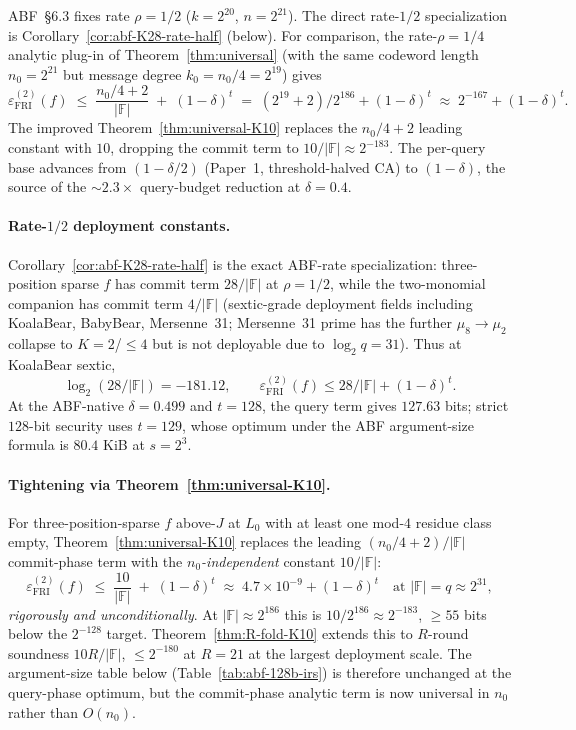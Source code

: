 \documentclass[11pt]{article}
\theoremstyle{definition}
\theoremstyle{remark}
\newcommand{\FF}{\mathbb{F}}
\begin{document}
ABF~\S 6.3 fixes rate $\rho = 1/2$ ($k = 2^{20}$, $n = 2^{21}$). The
direct rate-$1/2$ specialization is Corollary~\ref{cor:abf-K28-rate-half}
(below). For comparison, the rate-$\rho = 1/4$ analytic plug-in of
Theorem~\ref{thm:universal} (with the same codeword length $n_0 = 2^{21}$
but message degree $k_0 = n_0/4 = 2^{19}$) gives
\[
\varepsilon^{(2)}_{\mathrm{FRI}}(f)
\;\leq\;
\frac{n_0/4 + 2}{|\mathbb{F}|}
\;+\;
(1-\delta)^{t}
\;=\;
(2^{19} + 2)/2^{186} + (1-\delta)^{t} \;\approx\; 2^{-167} + (1-\delta)^{t}.
\]
The improved Theorem~\ref{thm:universal-K10} replaces the
$n_0/4 + 2$ leading constant with $10$, dropping the commit term to
$10/|\mathbb{F}| \approx 2^{-183}$. The per-query base advances from
$(1{-}\delta/2)$ (Paper~1, threshold-halved CA) to $(1{-}\delta)$,
the source of the ${\sim}2.3{\times}$ query-budget reduction at
$\delta = 0.4$.

\paragraph{Rate-$1/2$ deployment constants.}
Corollary~\ref{cor:abf-K28-rate-half} is the exact ABF-rate specialization:
three-position sparse $f$ has commit term $28/|\FF|$ at $\rho=1/2$,
while the two-monomial companion has commit term $4/|\FF|$ (sextic-grade
deployment fields including KoalaBear, BabyBear, Mersenne~31; Mersenne~31
prime has the further $\mu_8 \to \mu_2$ collapse to $K = 2$/$\leq 4$ but
is not deployable due to $\log_2 q = 31$). Thus at KoalaBear sextic,
\[
 \log_2(28/|\FF|) = -181.12,
 \qquad
 \varepsilon_{\mathrm{FRI}}^{(2)}(f) \leq 28/|\FF| + (1-\delta)^t .
\]
At the ABF-native $\delta=0.499$ and $t=128$, the query term gives
$127.63$ bits; strict $128$-bit security uses $t=129$, whose optimum
under the ABF argument-size formula is $80.4$ KiB at $s=2^3$.

\paragraph{Tightening via Theorem~\ref{thm:universal-K10}.}
For three-position-sparse $f$ above-$J$ at $L_0$ with at least one
mod-$4$ residue class empty, Theorem~\ref{thm:universal-K10} replaces
the leading $(n_0/4 + 2)/|\mathbb{F}|$ commit-phase term with the
\emph{$n_0$-independent} constant $10 / |\mathbb{F}|$:
\[
\varepsilon^{(2)}_{\mathrm{FRI}}(f)
\;\leq\;
\frac{10}{|\mathbb{F}|} \;+\; (1-\delta)^{t}
\;\approx\; 4.7 \times 10^{-9} + (1-\delta)^{t}
\quad \text{at } |\mathbb{F}| = q \approx 2^{31},
\]
\emph{rigorously and unconditionally}. At
$|\mathbb{F}| \approx 2^{186}$ this is
$10 / 2^{186} \approx 2^{-183}$, $\geq 55$ bits below the $2^{-128}$
target. Theorem~\ref{thm:R-fold-K10} extends this to $R$-round soundness
$10R / |\mathbb{F}|$, $\leq 2^{-180}$ at $R = 21$ at the largest
deployment scale. The argument-size table below
(Table~\ref{tab:abf-128b-irs}) is therefore unchanged at the
query-phase optimum, but the commit-phase analytic term is now
universal in $n_0$ rather than $O(n_0)$.
\end{document}
